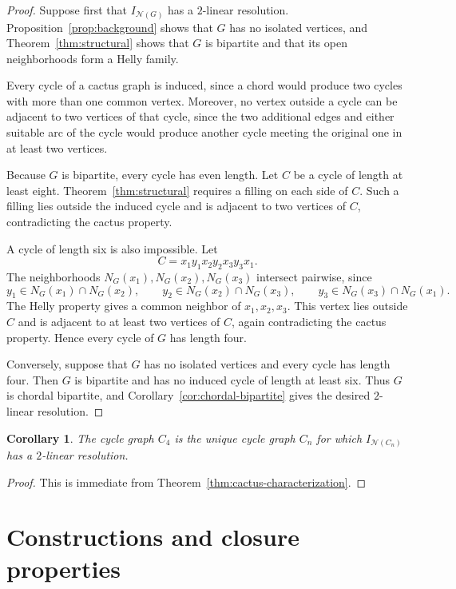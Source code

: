 \documentclass[11pt]{amsart}
\newtheorem{corollary}[theorem]{Corollary}
\theoremstyle{definition}
\theoremstyle{remark}
\numberwithin{equation}{section}
\newcommand{\NN}{\mathcal N}
\begin{document}
	\begin{proof}
		Suppose first that \(I_{\NN(G)}\) has a \(2\)-linear resolution.
		Proposition~\ref{prop:background} shows that \(G\) has no isolated vertices,
		and Theorem~\ref{thm:structural} shows that \(G\) is bipartite and that its
		open neighborhoods form a Helly family.

		Every cycle of a cactus graph is induced, since a chord would produce two
		cycles with more than one common vertex. Moreover, no vertex outside a cycle
		can be adjacent to two vertices of that cycle, since the two additional edges
		and either suitable arc of the cycle would produce another cycle meeting the
		original one in at least two vertices.

		Because \(G\) is bipartite, every cycle has even length. Let \(C\) be a cycle
		of length at least eight. Theorem~\ref{thm:structural} requires a filling on
		each side of \(C\). Such a filling lies outside the induced cycle and is
		adjacent to two vertices of \(C\), contradicting the cactus property.

		A cycle of length six is also impossible. Let
		\[
		C=x_1y_1x_2y_2x_3y_3x_1.
		\]
		The neighborhoods \(N_G(x_1),N_G(x_2),N_G(x_3)\) intersect pairwise, since
		\[
		y_1\in N_G(x_1)\cap N_G(x_2),\qquad
		y_2\in N_G(x_2)\cap N_G(x_3),\qquad
		y_3\in N_G(x_3)\cap N_G(x_1).
		\]
		The Helly property gives a common neighbor of \(x_1,x_2,x_3\). This vertex
		lies outside \(C\) and is adjacent to at least two vertices of \(C\), again
		contradicting the cactus property. Hence every cycle of \(G\) has length four.

		Conversely, suppose that \(G\) has no isolated vertices and every cycle has
		length four. Then \(G\) is bipartite and has no induced cycle of length at
		least six. Thus \(G\) is chordal bipartite, and
		Corollary~\ref{cor:chordal-bipartite} gives the desired \(2\)-linear
		resolution.
	\end{proof}
	\begin{corollary}\label{cor:unique_cycle}
		The cycle graph \(C_4\) is the unique cycle graph \(C_n\) for which
		\(I_{\NN(C_n)}\) has a \(2\)-linear resolution.
	\end{corollary}
	
	\begin{proof}
		This is immediate from Theorem~\ref{thm:cactus-characterization}.
	\end{proof}
	
	\section{Constructions and closure properties}\label{sec:constructions}
	
\end{document}
